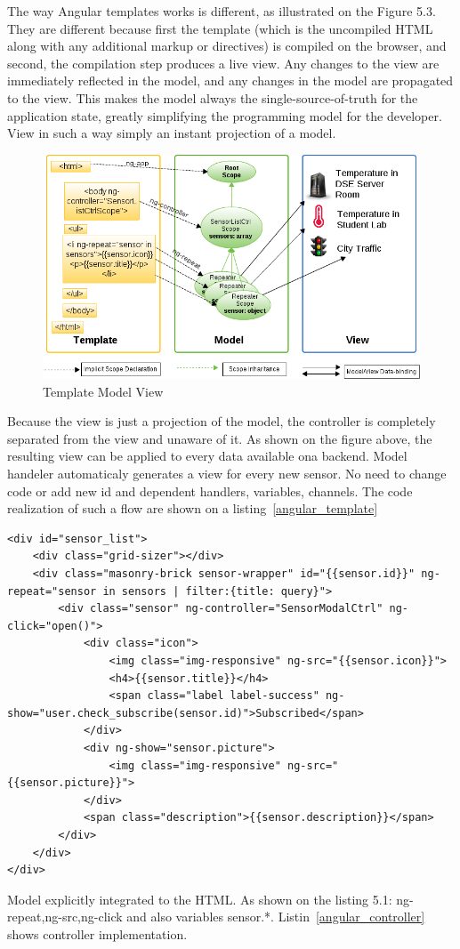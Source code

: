 	The way Angular templates works is different, as illustrated on the Figure 5.3. They are different because first the template (which is the uncompiled HTML along with any additional markup or directives) is compiled on the browser, and second, the compilation step produces a live view. Any changes to the view are immediately reflected in the model, and any changes in the model are propagated to the view. This makes the model always the single-source-of-truth for the application state, greatly simplifying the programming model for the developer. View in such a way simply an instant projection of a model.
	    \begin{figure}[!ht]
		\centering
		\includegraphics[scale=0.6]{images/3wayBinding.png}   
		\caption[Template Model View]{Template Model View}
		\label{img:interfaces}                           
		\end{figure}
        
    Because the view is just a projection of the model, the controller is completely separated from the view and unaware of it. As shown on the figure above, the resulting view can be applied to every data available ona  backend. Model handeler automaticaly generates a view for every new sensor. No need to change code or add new id and dependent handlers, variables, channels.
    The code realization of such a flow are shown on a listing~\ref{angular_template}
    \begin{lstlisting}[label=angular_template,caption=Template registry.html]
<div id="sensor_list">
    <div class="grid-sizer"></div>
    <div class="masonry-brick sensor-wrapper" id="{{sensor.id}}" ng-repeat="sensor in sensors | filter:{title: query}">
        <div class="sensor" ng-controller="SensorModalCtrl" ng-click="open()">
            <div class="icon">
                <img class="img-responsive" ng-src="{{sensor.icon}}">
                <h4>{{sensor.title}}</h4>
                <span class="label label-success" ng-show="user.check_subscribe(sensor.id)">Subscribed</span>
            </div>
            <div ng-show="sensor.picture">
                <img class="img-responsive" ng-src="{{sensor.picture}}">
            </div>
            <span class="description">{{sensor.description}}</span>
        </div>
    </div>
</div>
    \end{lstlisting}
    Model explicitly integrated to the HTML. As shown on the listing 5.1: ng-repeat,ng-src,ng-click and also variables {{sensor.*}}. Listin~\ref{angular_controller} shows controller implementation.

